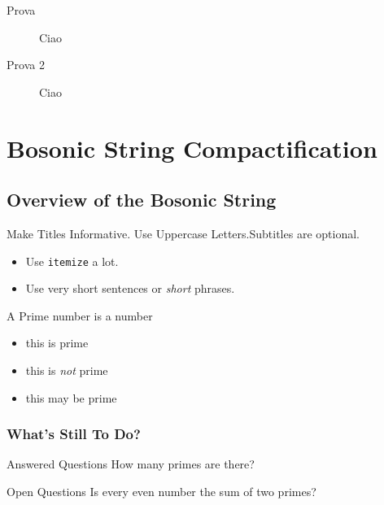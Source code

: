 \documentclass{beamer}
\begin{document}
\begin{frame}
  \begin{description}
    \item[Prova] Ciao
    \item[Prova 2] Ciao  
  \end{description}
  
\end{frame}

\section{Bosonic String Compactification}

\subsection{Overview of the Bosonic String}

\begin{frame}{Make Titles Informative. Use Uppercase Letters.}{Subtitles are optional.}

	\begin{itemize}
		\item
		      Use \texttt{itemize} a lot.
		\item
		      Use very short sentences or \emph{short} \alert{phrases}.
	\end{itemize}
	\begin{definition}
		A \alert{Prime number} is a number
	\end{definition}
	\pause
	\begin{example}
		\begin{itemize}
			\item this is prime

			\item this is \emph{not} prime

			\item this may be prime
		\end{itemize}
	\end{example}
\end{frame}

\begin{frame}
	\frametitle{What's Still To Do?}
	\begin{block}{Answered Questions}
		How many primes are there?
	\end{block}
	\begin{block}{Open Questions}
		Is every even number the sum of two primes?
	\end{block}
\end{frame}
\end{document}
